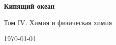 \begin{titlepage}
  \centering
  \vspace*{2cm}
  {\LARGE\bfseries Кипящий океан\par}
  \vspace{0.8cm}
  {\Large Том IV. Химия и физическая химия\par}
  \vfill
  {\large \today\par}
\end{titlepage}
\cleardoublepage
\tableofcontents
\cleardoublepage

